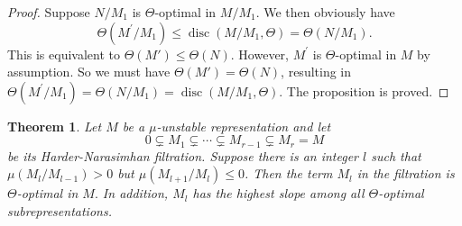 \documentclass[a4paper]{amsart}
\numberwithin{equation}{section}
\theoremstyle{plain}
\newtheorem{theorem}{Theorem}[section]
\theoremstyle{definition}
\DeclareMathOperator{\disc}{disc}
\begin{document}
\begin{proof}
Suppose $N/M_1$ is $\Theta$-optimal in $M/M_1$. 
We then obviously have $$\Theta(M^{\prime}/M_1)\leq \disc(M/M_1,\Theta)=\Theta(N/M_1).$$ This is equivalent to $\Theta(M')\leq \Theta(N)$. However, $M^{\prime}$ is $\Theta$-optimal in $M$ by assumption. So we must have $\Theta(M')=\Theta(N)$, resulting in  $\Theta(M^{\prime}/M_1)= \Theta(N/M_1)=\disc(M/M_1,\Theta)$. The proposition is proved.
\end{proof}

\begin{theorem}\label{HN_contains_witness_discrepancy}
Let $M$ be a $\mu$-unstable representation and let $$0\subsetneq M_{1}\subsetneq \cdots \subsetneq M_{r-1}\subsetneq M_{r}=M$$ be its Harder-Narasimhan filtration. Suppose there is an integer $l$ such that $\mu(M_{l}/M_{l-1})>0$ but $\mu(M_{l+1}/M_{l})\leq 0$. Then the term $M_l$ in the filtration is $\Theta$-optimal in $M.$ In addition, $M_l$ has the highest slope among all $\Theta$-optimal subrepresentations.
\end{theorem}
\end{document}

